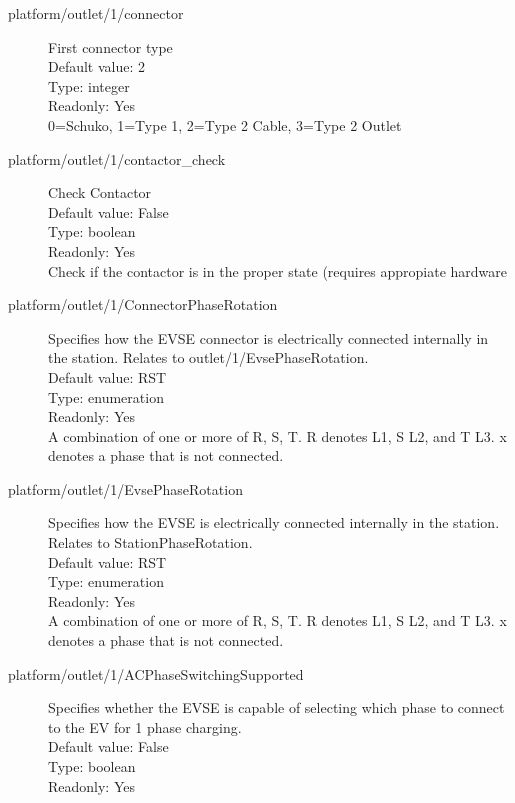\begin{description}
\item[platform/outlet/1/connector] First connector type\\
  Default value: 2\\
  Type: integer\\
  Readonly: Yes\\
  0=Schuko, 1=Type 1, 2=Type 2 Cable, 3=Type 2 Outlet\\

\item[platform/outlet/1/contactor\_check] Check Contactor\\
  Default value: False\\
  Type: boolean\\
  Readonly: Yes\\
  Check if the contactor is in the proper state (requires appropiate hardware\\

\item[platform/outlet/1/ConnectorPhaseRotation] Specifies how the EVSE connector is electrically connected internally in the station. Relates to outlet/1/EvsePhaseRotation.\\
  Default value: RST\\
  Type: enumeration\\
  Readonly: Yes\\
  A combination of one or more of R, S, T. R denotes L1, S L2, and T L3. x denotes a phase that is not connected.\\

\item[platform/outlet/1/EvsePhaseRotation] Specifies how the EVSE is electrically connected internally in the station. Relates to StationPhaseRotation.\\
  Default value: RST\\
  Type: enumeration\\
  Readonly: Yes\\
  A combination of one or more of R, S, T. R denotes L1, S L2, and T L3. x denotes a phase that is not connected.\\

\item[platform/outlet/1/ACPhaseSwitchingSupported] Specifies whether the EVSE is capable of selecting which phase to connect to the EV for 1 phase charging.\\
  Default value: False\\
  Type: boolean\\
  Readonly: Yes\\


\end{description}

